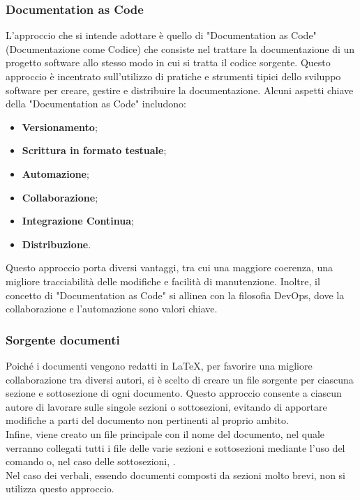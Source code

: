 \subsubsection{Documentation as Code}\label{sec:DocumentationAscode}
L'approccio che si intende adottare è quello di "Documentation as Code" (Documentazione come Codice) che consiste nel trattare la documentazione di un progetto software allo stesso modo in cui si tratta il codice sorgente. Questo approccio è incentrato sull'utilizzo di pratiche e strumenti tipici dello sviluppo software per creare, gestire e distribuire la documentazione.
Alcuni aspetti chiave della "Documentation as Code" includono:
\begin{itemize}
    \item \textbf{Versionamento};
    \item \textbf{Scrittura in formato testuale};
    \item \textbf{Automazione};
    \item \textbf{Collaborazione};
    \item \textbf{Integrazione Continua};
    \item \textbf{Distribuzione}.
\end{itemize}
Questo approccio porta diversi vantaggi, tra cui una maggiore coerenza, una migliore tracciabilità delle modifiche e facilità di manutenzione. Inoltre, il concetto di "Documentation as Code" si allinea con la filosofia DevOps, dove la collaborazione e l'automazione sono valori chiave.\\

\subsubsection{Sorgente documenti}
Poiché i documenti vengono redatti in \LaTeX, per favorire una migliore collaborazione tra diversi autori, si è scelto di creare un file sorgente per ciascuna sezione e sottosezione di ogni documento. Questo approccio consente a ciascun autore di lavorare sulle singole sezioni o sottosezioni, evitando di apportare modifiche a parti del documento non pertinenti al proprio ambito. \\
Infine, viene creato un file principale con il nome del documento, nel quale verranno collegati tutti i file delle varie sezioni e sottosezioni mediante l'uso del comando \verb|| o, nel caso delle sottosezioni, \verb||. \\
Nel caso dei verbali, essendo documenti composti da sezioni molto brevi, non si utilizza questo approccio.

